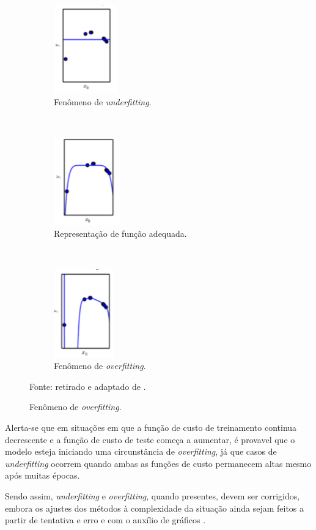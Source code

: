 \begin{figure}[H]
   \caption{Fenômenos de \textit{underfitting} e \textit{overfitting}.}
   \centering
   \label{deep:fig:5}
    \begin{subfigure}[t]{0.45\textwidth}
        \centering
        \includegraphics[height=1.5in]{recursos/imagens/deep/under.png}
        \caption{Fenômeno de \textit{underfitting}.}
        \label{deep:fig:5.1}
    \end{subfigure}
    ~ 
    \begin{subfigure}[t]{0.45\textwidth}
        \centering
        \includegraphics[height=1.5in]{recursos/imagens/deep/apx.png}
        \caption{Representação de função adequada.}
        \label{deep:fig:5.2}
    \end{subfigure}
    ~
    \begin{subfigure}[t]{0.45\textwidth}
        \centering
        \includegraphics[height=1.5in]{recursos/imagens/deep/over.png}
        \caption{Fenômeno de \textit{overfitting}.}
        \label{deep:fig:5.3}
    \end{subfigure}

    Fonte: retirado e adaptado de \cite{Goodfellow2016}.
\end{figure}

Alerta-se que em situações em que a função de custo de treinamento continua decrescente e a função de custo de teste começa a aumentar, é provavel que o modelo esteja iniciando uma circunstância de \textit{overfitting}, já que casos de \textit{underfitting} ocorrem quando ambas as funções de custo permanecem altas mesmo após muitas épocas.

Sendo assim, \textit{underfitting} e \textit{overfitting}, quando presentes, devem ser corrigidos, embora os ajustes dos métodos à complexidade da situação ainda sejam feitos a partir de tentativa e erro e com o auxílio de gráficos \cite{Goodfellow2016}.
